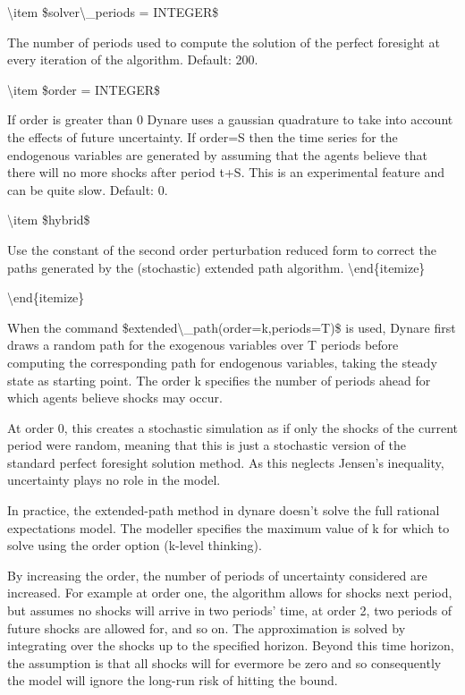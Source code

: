 \documentclass[10pt,math=newtx,citestyle=gb7714-2015,bibstyle=gb7714-2015]{elegantbook}
\begin{document}
	\textbackslash{}item \$solver\textbackslash{}\_periods = INTEGER\$
	
	The number of periods used to compute the solution of the perfect foresight at every iteration of the algorithm. Default: 200.
	
	\textbackslash{}item \$order = INTEGER\$
	
	If order is greater than 0 Dynare uses a gaussian quadrature to take into account the effects of future uncertainty. If order=S then the time series for the endogenous variables are generated by assuming that the agents believe that there will no more shocks after period t+S. This is an experimental feature and can be quite slow. Default: 0.
	
	\textbackslash{}item \$hybrid\$
	
	Use the constant of the second order perturbation reduced form to correct the paths generated by the (stochastic) extended path algorithm.
	\textbackslash{}end\{itemize\}
	
	
	\textbackslash{}end\{itemize\}
	
	When the command \$extended\textbackslash{}\_path(order=k,periods=T)\$ is used, Dynare first draws a random path for the exogenous variables over T periods before computing the corresponding path for endogenous variables, taking the steady state as starting
	point. The order k specifies the number of periods ahead for which agents believe shocks may occur.
	
	At order 0, this creates a stochastic simulation as if only the shocks of the current period were random, meaning that this is just a stochastic version of the standard perfect foresight solution method. As this neglects Jensen’s inequality, uncertainty plays no role in the model.
	
	In practice, the extended-path method in dynare doesn't solve the full rational expectations model. The modeller specifies the maximum value of k for which to solve using the order option (k-level thinking).
	
	By increasing the order, the number of periods of uncertainty
	considered are increased. For example at order one, the algorithm allows for shocks next period, but assumes no shocks will arrive in two periods’ time, at order 2, two periods of future shocks are allowed for, and so on. The approximation
	is solved by integrating over the shocks up to the specified horizon. Beyond this time horizon, the assumption is that all shocks will for evermore be zero and so consequently the model will ignore the long-run risk of hitting the bound.
	
\end{document}
